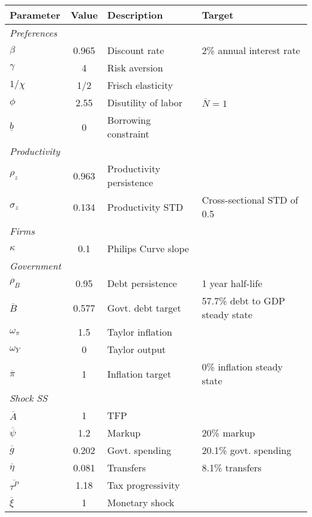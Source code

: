 \begin{tabular}{lcll}
    \toprule
    \textbf{Parameter} & \textbf{Value} & \textbf{Description} & \textbf{Target} \\
    \midrule
    \textit{Preferences} \\
    \quad $\beta$ & 0.965 & Discount rate & 2\% annual interest rate \\
    \quad $\gamma$ & 4 & Risk aversion & \textcite{kaplan2018monetary} \\
    \quad $1/\chi$ & 1/2 & Frisch elasticity & \textcite{chetty2012bounds} \\
    \quad $\phi$ & 2.55 & Disutility of labor & $\overline{N} = 1$ \\
    \quad $\underline{b}$ & 0 & Borrowing constraint \\
    \midrule
    \textit{Productivity} \\
    \quad $\rho_z$ & 0.963 & Productivity persistence & \textcite{storesletten2004cyclical} \\
    \quad $\sigma_z$ & 0.134 & Productivity STD & Cross-sectional STD of 0.5 \\
    \midrule
    \textit{Firms} \\
    \quad $\kappa$ & 0.1 & Philips Curve slope \\
    \midrule
    \textit{Government} \\
    \quad $\rho_B$ & 0.95 & Debt persistence & 1 year half-life \\
    \quad $\overline{B}$ & 0.577 & Govt. debt target & 57.7\% debt to GDP steady state \\
    \quad $\omega_\pi$ & 1.5 & Taylor inflation \\
    \quad $\omega_Y$ & 0 & Taylor output \\
    \quad $\overline{\pi}$ & 1 & Inflation target & 0\% inflation steady state \\
    \midrule
    \textit{Shock SS} \\
    \quad $\overline{A}$ & 1 & TFP \\
    \quad $\overline{\psi}$ & 1.2 & Markup & 20\% markup \\
    \quad $\overline{g}$ & 0.202 & Govt. spending & 20.1\% govt. spending \\
    \quad $\overline{\eta}$ & 0.081 & Transfers & 8.1\% transfers \\
    \quad $\overline{\tau^P}$ & 1.18 & Tax progressivity & \textcite{heathcote2017optimal} \\
    \quad $\overline{\xi}$ & 1 & Monetary shock \\
    \bottomrule
\end{tabular}
